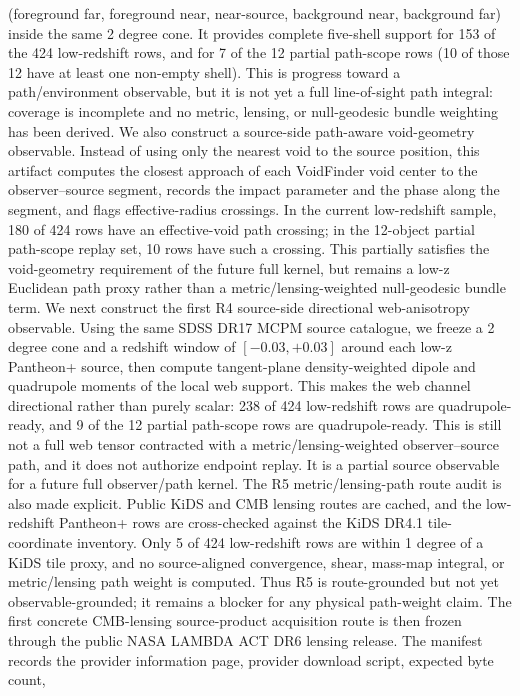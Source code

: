 \documentclass[11pt]{article}
\begin{document}
(foreground far, foreground near, near-source, background near, background far)
inside the same 2 degree cone.  It provides complete five-shell support for
153 of the 424 low-redshift rows, and for 7 of the 12 partial path-scope rows
(10 of those 12 have at least one non-empty shell).  This is progress toward a
path/environment observable, but it is not yet a full line-of-sight path
integral: coverage is incomplete and no metric, lensing, or null-geodesic
bundle weighting has been derived.
We also construct a source-side path-aware void-geometry observable.  Instead
of using only the nearest void to the source position, this artifact computes
the closest approach of each VoidFinder void center to the observer--source
segment, records the impact parameter and the phase along the segment, and
flags effective-radius crossings.  In the current low-redshift sample, 180 of
424 rows have an effective-void path crossing; in the 12-object partial
path-scope replay set, 10 rows have such a crossing.  This partially satisfies
the void-geometry requirement of the future full kernel, but remains a low-z
Euclidean path proxy rather than a metric/lensing-weighted null-geodesic bundle
term.
We next construct the first R4 source-side directional web-anisotropy
observable.  Using the same SDSS DR17 MCPM source catalogue, we freeze a
2 degree cone and a redshift window of \([-0.03,+0.03]\) around each low-z
Pantheon+ source, then compute tangent-plane density-weighted dipole and
quadrupole moments of the local web support.  This makes the web channel
directional rather than purely scalar: 238 of 424 low-redshift rows are
quadrupole-ready, and 9 of the 12 partial path-scope rows are quadrupole-ready.
This is still not a full web tensor contracted with a metric/lensing-weighted
observer--source path, and it does not authorize endpoint replay.  It is a
partial source observable for a future full observer/path kernel.
The R5 metric/lensing-path route audit is also made explicit.  Public KiDS and
CMB lensing routes are cached, and the low-redshift Pantheon+ rows are
cross-checked against the KiDS DR4.1 tile-coordinate inventory.  Only 5 of 424
low-redshift rows are within 1 degree of a KiDS tile proxy, and no
source-aligned convergence, shear, mass-map integral, or metric/lensing path
weight is computed.  Thus R5 is route-grounded but not yet
observable-grounded; it remains a blocker for any physical path-weight claim.
The first concrete CMB-lensing source-product acquisition route is then frozen
through the public NASA LAMBDA ACT DR6 lensing release.  The manifest records
the provider information page, provider download script, expected byte count,
\end{document}
